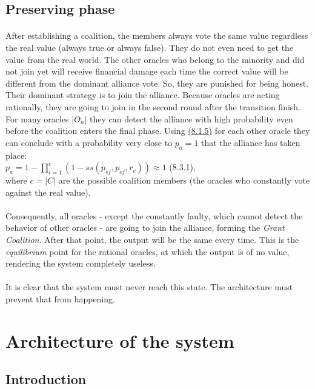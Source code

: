 \documentclass{article}
\begin{document}
{\subsection{Preserving phase}
\paragraph{ }

After establishing a coalition, the members always vote the same value regardless the real value (always true or always false). They do not even need to get the value from the real world. The other oracles who belong to the minority and did not join yet will receive financial damage each time the correct value will be different from the dominant alliance vote. So, they are punished for being honest. Their dominant strategy is to join the alliance. Because oracles are acting rationally, they are going to join in the second round after the transition finish. For many oracles $|O_n|$ they can detect the alliance with high probability even before the coalition enters the final phase. Using \hyperref[sec:815]{(8.1.5)} for each other oracle they can conclude with a probability very close to $p_a=1$ that the alliance has taken place:\\
$p_a=1-\prod_{i=1}^{c} (1-ss(p_{sf},p_{cf},r_c))\approx1$ (8.3.1),\\
where $c=|C|$ are the possible coalition members (the oracles who constantly vote against the real value).
\paragraph{ }
Consequently, all oracles - except the constantly faulty, which cannot detect the behavior of other oracles - are going to join the alliance, forming the \emph{Grant Coalition}. After that point, the output will be the same every time. This is the \emph{equilibrium} point for the rational oracles, at which the output is of no value, rendering the system completely useless.
\paragraph{ }
	It is clear that the system must never reach this state. The architecture must prevent that from happening.

\section{Architecture of the system}
\label{sec:sa}
\subsection{Introduction}
}
\end{document}
